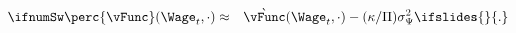   \begin{eqnarray}
    \label{eq:vBar}
    \ifnumSw  \perc{\vFunc}(\Wage_t,\cdot) & \approx & \grave{\vFunc}(\Wage_t,\cdot)-(\kappa/\Pi)\sigma^{2}_{\Psi} \label{eq:vApproxSticky}
                                                       \ifslides{}{.}
  \end{eqnarray}
